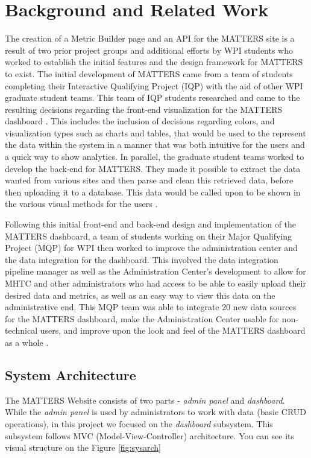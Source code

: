 \chapter{Background and Related Work}

	The creation of a Metric Builder page and an API for the MATTERS site is a 
	result of two prior project groups and additional efforts by WPI students 
	who worked to establish the initial features and the design framework for 
	MATTERS to exist. The initial development of MATTERS came from a team of 
	students completing their Interactive Qualifying Project (IQP) with the 
	aid of other WPI graduate student teams. This team of IQP students researched 
	and came to the resulting decisions regarding the front-end visualization for 
	the MATTERS dashboard \cite{prevreport}. This includes the inclusion of decisions 
	regarding colors, and visualization types such as charts and tables, that would 
	be used to the represent the data within the system in a manner that was both 
	intuitive for the users and a quick way to show analytics. In parallel, 
	the graduate student teams worked to develop the back-end for MATTERS. 
	They made it possible to extract the data wanted from various sites and 
	then parse and clean this retrieved data, before then uploading it to a 
	database. This data would be called upon to be shown in the various visual 
	methods for the users \cite{iqp}.

	Following this initial front-end and back-end design and implementation 
	of the MATTERS dashboard, a team of students working on their Major Qualifying 
	Project (MQP) for WPI then worked to improve the administration center and the 
	data integration for the dashboard. This involved the data integration pipeline 
	manager as well as the Administration Center's development to allow for MHTC 
	and other administrators who had access to be able to easily upload their 
	desired data and metrics, as well as an easy way to view this data on the 
	administrative end. This MQP team was able to integrate 20 new data sources 
	for the MATTERS dashboard, make the Administration Center usable for 
	non-technical users, and improve upon the look and feel of the MATTERS 
	dashboard as a whole \cite{iqp}.

	\section{System Architecture}
	
		The MATTERS Website consists of two parts - \emph{admin panel} and \emph{dashboard}.
		While the \emph{admin panel} is used by administrators to work with data 
		(basic CRUD operations), in this project we focused on the \emph{dashboard} subsystem.
		This subsystem follows MVC (Model-View-Controller) architecture. You can see its visual 
		structure on the Figure \ref{fig:sysarch}
		
